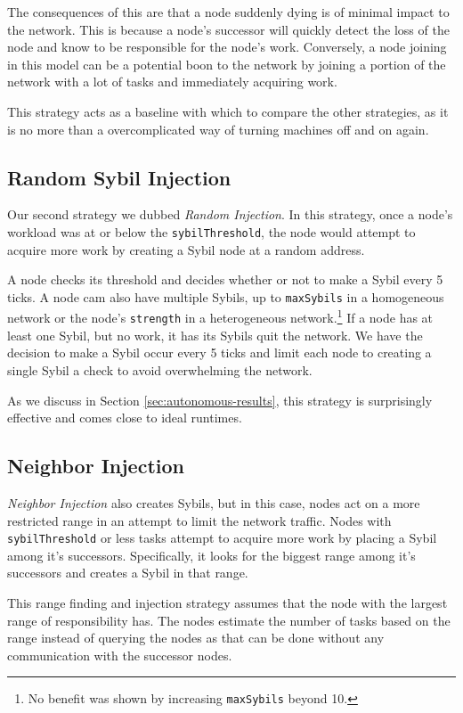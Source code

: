 The consequences of this are that a node suddenly dying is of minimal impact to the network.
This is because a node's successor will quickly detect the loss of the node and know to be responsible for the node's work.
Conversely, a node joining in this model can be a potential boon to the network by joining a portion of the network with a lot of tasks and immediately acquiring work.

This strategy acts as a baseline with which to compare the other strategies, as it is no more than a overcomplicated way of turning machines off and on again. 


\subsection{Random Sybil Injection}
Our second strategy we dubbed \textit{Random Injection}.
In this strategy, once a node's workload was at or below the \texttt{sybilThreshold}, the node would attempt to acquire more work by creating a Sybil node at a random address.

A node checks its threshold and decides whether or not to make a Sybil every 5 ticks.
A node cam also have multiple Sybils, up to \texttt{maxSybils} in a homogeneous network or the node's \texttt{strength} in a heterogeneous network.\footnote{No benefit was shown by increasing \texttt{maxSybils} beyond 10.}
If a node has at least one Sybil, but no work, it has its Sybils quit the network.
We have the decision to make a Sybil occur every 5 ticks and limit each node to creating a single Sybil a check to avoid overwhelming the network.

As we discuss in Section \ref{sec:autonomous-results}, this strategy is surprisingly effective and comes close to ideal runtimes.


\subsection{Neighbor Injection}
\textit{Neighbor Injection} also creates Sybils, but in this case, nodes act on a more restricted range in an attempt to limit the network traffic.
Nodes with \texttt{sybilThreshold} or less tasks attempt to acquire more work by placing a Sybil among it's successors.
Specifically, it looks for the biggest range among it's successors and creates a Sybil in that range.

This range finding and injection strategy assumes that the node with the largest range of responsibility has.
The nodes estimate the number of tasks based on the range instead of querying the nodes as that can be done without any communication with the successor nodes.

